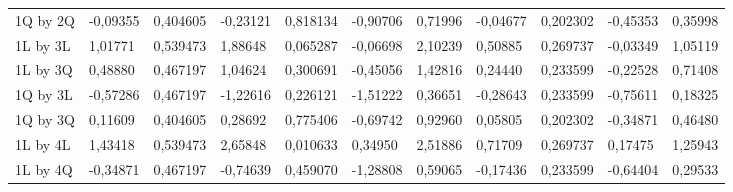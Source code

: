 \begin{table}[H]
{\begin{tabular}{lllllllllll}
\rowcolor[HTML]{FFFFFF} 
1Q by 2Q       & {\color[HTML]{181A1B} -0,09355} & {\color[HTML]{181A1B} 0,404605} & {\color[HTML]{181A1B} -0,23121} & {\color[HTML]{181A1B} 0,818134} & {\color[HTML]{181A1B} -0,90706} & {\color[HTML]{181A1B} 0,71996}  & {\color[HTML]{181A1B} -0,04677} & {\color[HTML]{181A1B} 0,202302} & {\color[HTML]{181A1B} -0,45353} & {\color[HTML]{181A1B} 0,35998}  \\
\rowcolor[HTML]{FFFFFF} 
1L by 3L       & {\color[HTML]{181A1B} 1,01771}  & {\color[HTML]{181A1B} 0,539473} & {\color[HTML]{181A1B} 1,88648}  & {\color[HTML]{181A1B} 0,065287} & {\color[HTML]{181A1B} -0,06698} & {\color[HTML]{181A1B} 2,10239}  & {\color[HTML]{181A1B} 0,50885}  & {\color[HTML]{181A1B} 0,269737} & {\color[HTML]{181A1B} -0,03349} & {\color[HTML]{181A1B} 1,05119}  \\
\rowcolor[HTML]{FFFFFF} 
1L by 3Q       & {\color[HTML]{181A1B} 0,48880}  & {\color[HTML]{181A1B} 0,467197} & {\color[HTML]{181A1B} 1,04624}  & {\color[HTML]{181A1B} 0,300691} & {\color[HTML]{181A1B} -0,45056} & {\color[HTML]{181A1B} 1,42816}  & {\color[HTML]{181A1B} 0,24440}  & {\color[HTML]{181A1B} 0,233599} & {\color[HTML]{181A1B} -0,22528} & {\color[HTML]{181A1B} 0,71408}  \\
\rowcolor[HTML]{FFFFFF} 
1Q by 3L       & {\color[HTML]{181A1B} -0,57286} & {\color[HTML]{181A1B} 0,467197} & {\color[HTML]{181A1B} -1,22616} & {\color[HTML]{181A1B} 0,226121} & {\color[HTML]{181A1B} -1,51222} & {\color[HTML]{181A1B} 0,36651}  & {\color[HTML]{181A1B} -0,28643} & {\color[HTML]{181A1B} 0,233599} & {\color[HTML]{181A1B} -0,75611} & {\color[HTML]{181A1B} 0,18325}  \\
\rowcolor[HTML]{FFFFFF} 
1Q by 3Q       & {\color[HTML]{181A1B} 0,11609}  & {\color[HTML]{181A1B} 0,404605} & {\color[HTML]{181A1B} 0,28692}  & {\color[HTML]{181A1B} 0,775406} & {\color[HTML]{181A1B} -0,69742} & {\color[HTML]{181A1B} 0,92960}  & {\color[HTML]{181A1B} 0,05805}  & {\color[HTML]{181A1B} 0,202302} & {\color[HTML]{181A1B} -0,34871} & {\color[HTML]{181A1B} 0,46480}  \\
\rowcolor[HTML]{FFFFFF} 
1L by 4L       & {\color[HTML]{FF0000} 1,43418}  & {\color[HTML]{FF0000} 0,539473} & {\color[HTML]{FF0000} 2,65848}  & {\color[HTML]{FF0000} 0,010633} & {\color[HTML]{FF0000} 0,34950}  & {\color[HTML]{FF0000} 2,51886}  & {\color[HTML]{FF0000} 0,71709}  & {\color[HTML]{FF0000} 0,269737} & {\color[HTML]{FF0000} 0,17475}  & {\color[HTML]{FF0000} 1,25943}  \\
\rowcolor[HTML]{FFFFFF} 
1L by 4Q       & {\color[HTML]{181A1B} -0,34871} & {\color[HTML]{181A1B} 0,467197} & {\color[HTML]{181A1B} -0,74639} & {\color[HTML]{181A1B} 0,459070} & {\color[HTML]{181A1B} -1,28808} & {\color[HTML]{181A1B} 0,59065}  & {\color[HTML]{181A1B} -0,17436} & {\color[HTML]{181A1B} 0,233599} & {\color[HTML]{181A1B} -0,64404} & {\color[HTML]{181A1B} 0,29533}  \\

\end{tabular}}
\end{table}
